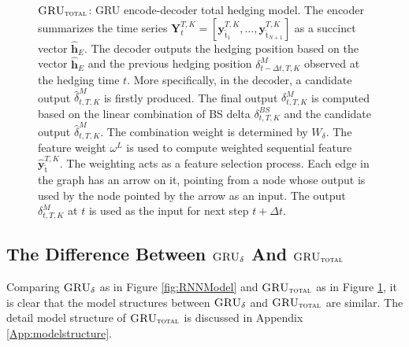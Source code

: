 \documentclass[letterpaper,12pt,titlepage,oneside,final]{book}
\numberwithin{equation}{section}
\theoremstyle{definition}
\newcommand{\model}{\textsc{GRU}_\delta}
\newcommand{\modelT}{\textsc{GRU}_{\textsc{total}}}
\newcommand{\vy}{\mathbf{y}}
\newcommand{\DT}{\Delta t}
\newcommand{\nt}{\breve{\text{t}}}
\begin{document}
\begin{figure}[htp!]
{
	}
	\caption{$\modelT$: GRU encode-decoder total hedging model. The encoder summarizes the time series $\mathbf{Y}_{t}^{T,K}=\left[\vy^{T,K}_{\nt_{1}},\dots,\vy^{T,K}_{\nt_{N+1}}\right]$ as a succinct  vector $\widehat{\mathbf{h}}_E$. The decoder outputs the hedging position based on the vector $\widehat{\mathbf{h}}_E$ and the previous hedging position $\delta^M_{t-\Delta t,T,K}$ observed at the hedging time $t$. More specifically, in the decoder, a candidate output $\widehat{\delta}^M_{t,T,K}$ is firstly produced. The final output $\delta^M_{t,T,K}$ is computed based on the linear combination of BS delta $\delta^{BS}_{t,T,K}$ and the candidate output  $\widehat{\delta}^M_{t,T,K}$. The combination weight is determined by  $W_{\delta}$. The feature weight $\omega^L$ is used to compute weighted sequential feature $\widehat{\vy}^{T,K}_{\nt}$. The weighting acts as a feature selection process.
		Each edge in the graph has an arrow on it, pointing from a node whose output is used by the node pointed by the arrow as an input. The output $\delta^M_{t,T,K}$ at $t$ is used as the input for next step $t+\DT$.}
	\label{fig:RNNModelTotal}
\end{figure}
\subsection{The Difference Between  $\model$ And $\modelT$}
Comparing  $\model$ as in Figure \ref{fig:RNNModel} and  $\modelT$ as in Figure \ref{fig:RNNModelTotal}, it is clear that the model structures between $\model$ and $\modelT$ are similar. The detail model structure of $\modelT$ is discussed in Appendix \ref{App:modelstructure}.
\end{document}
